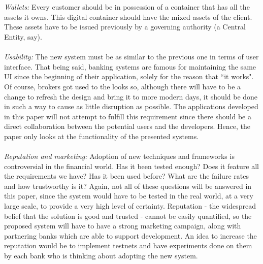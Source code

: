\documentclass[12pt,twoside]{article}
\begin{document}
\\ \\
\textit{Wallets:} Every customer should be in possession of a container that has all the assets it owns. This digital container should have the mixed assets of the client. These assets have to be issued previously by a governing authority (a Central Entity, say). 
\\ \\
\textit{Usability:} The new system must be as similar to the previous one in terms of user interface. That being said, banking systems are famous for maintaining the same UI since the beginning of their application, solely for the reason that ``it works". Of course, brokers got used to the looks so, although there will have to be a change to refresh the design and bring it to more modern days, it should be done in such a way to cause as little disruption as possible. The applications developed in this paper will not attempt to fulfill this requirement since there should be a direct collaboration between the potential users and the developers. Hence, the paper only looks at the functionality of the presented systems.
\\ \\
\textit{Reputation and marketing:} Adoption of new techniques and frameworks is controversial in the financial world. Has it been tested enough? Does it feature all the requirements we have? Has it been used before? What are the failure rates and how trustworthy is it? Again, not all of these questions will be answered in this paper, since the system would have to be tested in the real world, at a very large scale, to provide a very high level of certainty. Reputation - the widespread belief that the solution is good and trusted - cannot be easily quantified, so the proposed system will have to have a strong marketing campaign, along with partnering banks which are able to support development. An idea to increase the reputation would be to implement testnets and have experiments done on them by each bank who is thinking about adopting the new system.
\end{document}
